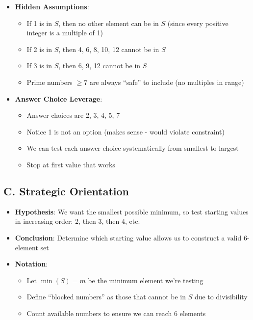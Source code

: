 \documentclass[12pt]{article}
\begin{document}
\begin{problemconfigbox}
\begin{itemize}[leftmargin=*]
    \item \textbf{Hidden Assumptions}:
    \begin{itemize}
        \item If 1 is in $S$, then no other element can be in $S$ (since every positive integer is a multiple of 1)
        \item If 2 is in $S$, then 4, 6, 8, 10, 12 cannot be in $S$
        \item If 3 is in $S$, then 6, 9, 12 cannot be in $S$
        \item Prime numbers $\geq 7$ are always ``safe'' to include (no multiples in range)
    \end{itemize}
    
    \item \textbf{Answer Choice Leverage}:
    \begin{itemize}
        \item Answer choices are 2, 3, 4, 5, 7
        \item Notice 1 is not an option (makes sense - would violate constraint)
        \item We can test each answer choice systematically from smallest to largest
        \item Stop at first value that works
    \end{itemize}
\end{itemize}

\subsection*{C. Strategic Orientation}
\begin{itemize}[leftmargin=*]
    \item \textbf{Hypothesis}: We want the smallest possible minimum, so test starting values in increasing order: 2, then 3, then 4, etc.
    
    \item \textbf{Conclusion}: Determine which starting value allows us to construct a valid 6-element set
    
    \item \textbf{Notation}:
    \begin{itemize}
        \item Let $\min(S) = m$ be the minimum element we're testing
        \item Define ``blocked numbers'' as those that cannot be in $S$ due to divisibility
        \item Count available numbers to ensure we can reach 6 elements
    \end{itemize}
    

\end{itemize}
\end{problemconfigbox}
\end{document}
